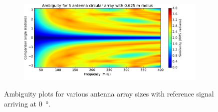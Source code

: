 \begin{figure}
\begin{subfigure}{\textwidth}
    \centering
    \includegraphics[width=\textwidth, clip=true, trim = 0 15 53 0]{ambiguity05}
  \end{subfigure}
  \caption{Ambiguity plots for various antenna array sizes with reference signal arriving at \SI{0}{\degree}.}
\end{figure}
